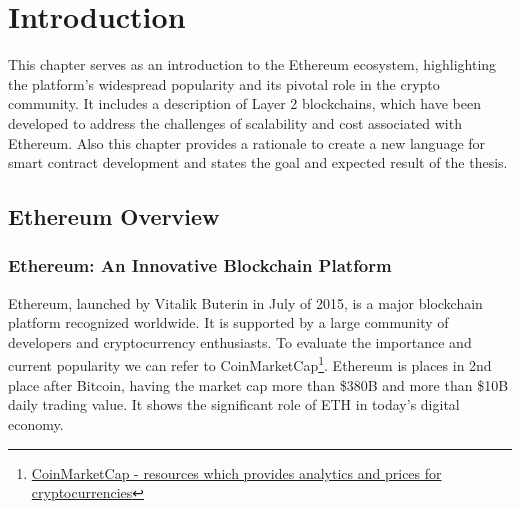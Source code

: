 \chapter{Introduction}
\label{chap:intro}

This chapter serves as an introduction to the Ethereum ecosystem, highlighting the platform's widespread popularity and its pivotal role in the crypto community. It includes a description of Layer 2 blockchains, which have been developed to address the challenges of scalability and cost associated with Ethereum. Also this chapter provides a rationale to create a new language for smart contract development and states the goal and expected result of the thesis.




\section{Ethereum Overview}

\subsection{Ethereum: An Innovative Blockchain Platform}
Ethereum, launched by Vitalik Buterin in July of 2015, is a major blockchain platform recognized worldwide. It is supported by a large community of developers and cryptocurrency enthusiasts. To evaluate the importance and current popularity we can refer to CoinMarketCap\footnote{\href{https://coinmarketcap.com/}{CoinMarketCap - resources which provides analytics and prices for cryptocurrencies}}. Ethereum is places in 2nd place after Bitcoin, having the market cap more than \$380B and more than \$10B daily trading value. It shows the significant role of ETH in today’s digital economy.

